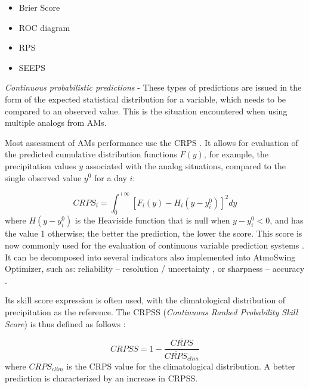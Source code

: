 \documentclass[review]{elsarticle}
\begin{document}
\begin{itemize}
	\item Brier Score \citep{Brier1950}
	\item ROC diagram \citep[Relative Operating Characteristic or Receiver Operating Characteristic,][]{Mason1982}
	\item RPS \citep[Ranked Probability Score,][]{Epstein1969}
	\item SEEPS \citep[Stable Equitable Error in Probability Space,][]{Rodwell2010,Rodwell2011}
\end{itemize}


\textit{Continuous probabilistic predictions} - These types of predictions are issued in the form of the expected statistical distribution for a variable, which needs to be compared to an observed value. This is the situation encountered when using multiple analogs from AMs.

Most assessment of AMs performance use the CRPS \citep[Continuous Ranked Probability Score,][]{Brown1974, Matheson1976, Hersbach2000}. It allows for evaluation of the predicted cumulative distribution functions $F(y)$, for example, the precipitation values $y$ associated with the analog situations, compared to the single observed value $y^{0}$ for a day $i$:

\begin{equation}
\label{eq:CRPS}
CRPS_{i} = \int_{0}^{+\infty} \left[ F_{i}(y)-H_{i}(y-y_{i}^{0})\right]^{2} dy
\end{equation}
where $H(y-y_{i}^{0})$ is the Heaviside function that is null when $y-y_{i}^{0}<0$, and has the value 1 otherwise; the better the prediction, the lower the score. This score is now commonly used for the evaluation of continuous variable prediction systems \citep{Casati2008, Marty2010}. It can be decomposed into several indicators also implemented into AtmoSwing Optimizer, such as: reliability -- resolution / uncertainty \citep{Hersbach2000}, or sharpness -- accuracy \citep{Bontron2004}.

Its skill score expression is often used, with the climatological distribution of precipitation as the reference. The CRPSS (\textit{Continuous Ranked Probability Skill Score}) is thus defined as follows \citep{Bradley2011}:

\begin{equation}
\label{eq:CRPSS}
CRPSS = 1-\frac{\overline{CRPS}}{\overline{CRPS}_{clim}}
\end{equation}
where $CRPS_{clim}$ is the CRPS value for the climatological distribution. A better prediction is characterized by an increase in CRPSS.
\end{document}
